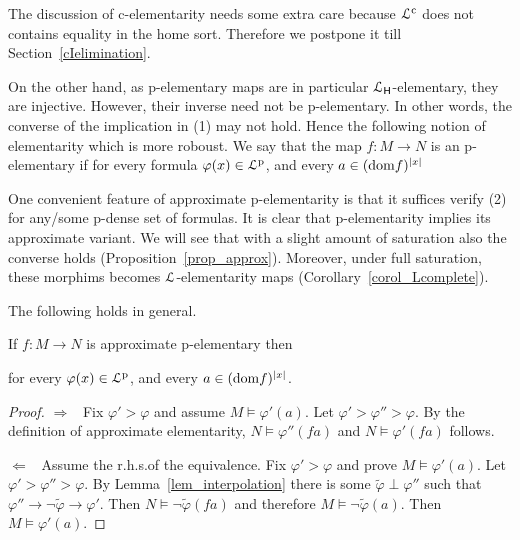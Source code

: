 \documentclass[10pt,oneside]{amsproc}
\renewcommand*{\emph}[1]{%
   \smash{\tikz[baseline]\node[rectangle, fill=teal!25, rounded corners, inner xsep=0.5ex, inner ysep=0.2ex, anchor=base, minimum height = 2.7ex]{\strut #1};}}
\begin{document}
The discussion of c-elementarity needs some extra care because ${\EuScript L}^{\rm c}$ does not contains equality in the home sort.
Therefore we postpone it till Section~\ref{cIelimination}.

On the other hand, as p-elementary maps are in particular ${\EuScript L}_{\sf H}$-elementary, they are injective.
However, their inverse need not be p-elementary.
In other words, the converse of the implication in (1) may not hold.
Hence the following notion of elementarity which is more roboust.
We say that the map $f:M\to N$ is an \emph{approximate\/} p-elementary if for every formula $\varphi(x)\in{\EuScript L}^{\rm p}$, and every $a\in({\rm dom }f)^{|x|}$


One convenient feature of approximate p-elementarity is that it suffices verify (2) for any/some p-dense set of formulas.
It is clear that p-elementarity implies its approximate variant.
We will see that with a slight amount of saturation also the converse holds (Proposition~\ref{prop_approx}).
Moreover, under full saturation, these morphims becomes ${\EuScript L}$-elementarity maps (Corollary~\ref{corol_Lcomplete}).

The following holds in general.

\begin{fact}\label{fact_HImorphisms}
  If $f:M\to N$ is approximate p-elementary then


  for every $\varphi(x)\in{\EuScript L}^{\rm p}$, and every $a\in({\rm dom }f)^{|x|}$.
\end{fact}

\begin{proof}
  $\Rightarrow$ \ Fix $\varphi'>\varphi$ and assume $M\models\varphi'(a)$.
  Let  $\varphi'>\varphi''>\varphi$.
  By the definition of approximate elementarity, $N\models\varphi''(fa)$ and $N\models\varphi'(fa)$ follows.
  
  $\Leftarrow$  \ 
  Assume the r.h.s.\@ of the equivalence.
  Fix $\varphi'>\varphi$ and prove $M\models\varphi'(a)$.
  Let  $\varphi'>\varphi''>\varphi$.
  By Lemma~\ref{lem_interpolation} there is some $\tilde{\varphi}\perp\varphi''$ such that $\varphi''\rightarrow\neg\tilde{\varphi}\rightarrow\varphi'$.
  Then $N\models\neg\tilde{\varphi}(fa)$ and therefore  $M\models\neg\tilde{\varphi}(a)$.
  Then $M\models\varphi'(a)$.
\end{proof}
\end{document}
